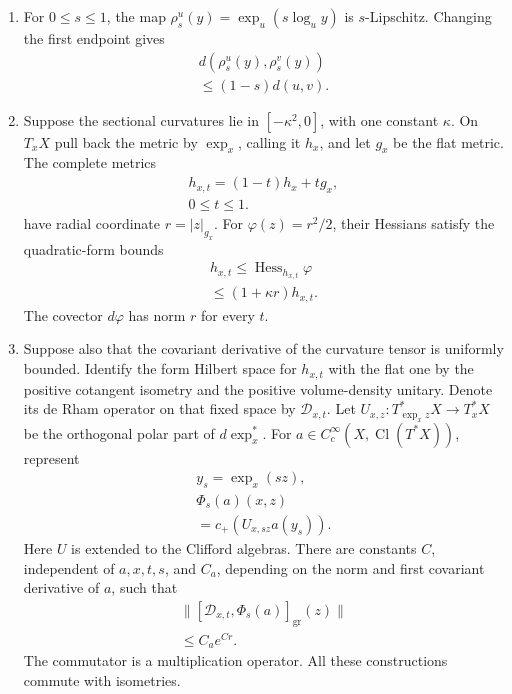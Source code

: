\documentclass[
  11pt,
]{article}
\providecommand{\tightlist}{%
  \setlength{\itemsep}{0pt}\setlength{\parskip}{0pt}}
\begin{document}
\begin{enumerate}
\def\labelenumi{\arabic{enumi}.}
\tightlist
\item
  For \(0\leq s\leq1\), the map \(\rho_s^u(y)=\exp_u(s\log_u y)\) is
  \(s\)-Lipschitz. Changing the first endpoint gives \[
  \begin{gathered}
  d(\rho_s^u(y),\rho_s^v(y))\\
  \leq(1-s)d(u,v).
  \end{gathered}
  \tag{11.7}
  \]
\item
  Suppose the sectional curvatures lie in \([-\kappa^2,0]\), with one
  constant \(\kappa\). On \(T_xX\) pull back the metric by \(\exp_x\),
  calling it \(h_x\), and let \(g_x\) be the flat metric. The complete
  metrics \[
  \begin{gathered}
  h_{x,t}=(1-t)h_x+t g_x,\\
  0\leq t\leq1.
  \end{gathered}
  \tag{11.8}
  \] have radial coordinate \(r=|z|_{g_x}\). For \(\varphi(z)=r^2/2\),
  their Hessians satisfy the quadratic-form bounds \[
  \begin{gathered}
  h_{x,t}\leq\operatorname{Hess}_{h_{x,t}}\varphi\\
  \leq(1+\kappa r)h_{x,t}.
  \end{gathered}
  \tag{11.9}
  \] The covector \(d\varphi\) has norm \(r\) for every \(t\).
\item
  Suppose also that the covariant derivative of the curvature tensor is
  uniformly bounded. Identify the form Hilbert space for \(h_{x,t}\)
  with the flat one by the positive cotangent isometry and the positive
  volume-density unitary. Denote its de Rham operator on that fixed
  space by \(\mathscr D_{x,t}\). Let
  \(U_{x,z}:T^*_{\exp_xz}X\to T_x^*X\) be the orthogonal polar part of
  \(d\exp_x^*\). For \(a\in C_c^\infty(X,\operatorname{Cl}(T^*X))\),
  represent \[
  \begin{gathered}
  y_s=\exp_x(sz),\\
  \Phi_s(a)(x,z)\\
  =c_+\!\left(U_{x,sz}a(y_s)\right).
  \end{gathered}
  \tag{11.10}
  \] Here \(U\) is extended to the Clifford algebras. There are
  constants \(C\), independent of \(a,x,t,s\), and \(C_a\), depending on
  the norm and first covariant derivative of \(a\), such that \[
  \begin{gathered}
  \|[\mathscr D_{x,t},\Phi_s(a)]_{\mathrm{gr}}(z)\|\\
  \leq C_a e^{Cr}.
  \end{gathered}
  \tag{11.11}
  \] The commutator is a multiplication operator. All these
  constructions commute with isometries.
\end{enumerate}
\end{document}
